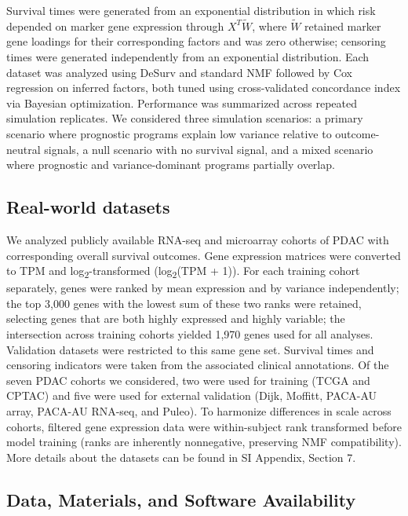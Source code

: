 \documentclass[9pt,twocolumn,twoside,]{pnas-new}
\begin{document}
Survival times were generated from an exponential distribution in which
risk depended on marker gene expression through \(X^T\widetilde{W}\),
where \(\widetilde{W}\) retained marker gene loadings for their
corresponding factors and was zero otherwise; censoring times were
generated independently from an exponential distribution. Each dataset
was analyzed using DeSurv and standard NMF followed by Cox regression on
inferred factors, both tuned using cross-validated concordance index via
Bayesian optimization. Performance was summarized across repeated
simulation replicates. We considered three simulation scenarios: a
primary scenario where prognostic programs explain low variance relative
to outcome-neutral signals, a null scenario with no survival signal, and
a mixed scenario where prognostic and variance-dominant programs
partially overlap.

\subsection{Real-world datasets}\label{real-world-datasets}

We analyzed publicly available RNA-seq and microarray cohorts of PDAC
with corresponding overall survival outcomes. Gene expression matrices
were converted to TPM and log\textsubscript{2}-transformed
(log\textsubscript{2}(TPM + 1)). For each training cohort separately,
genes were ranked by mean expression and by variance independently; the
top 3,000 genes with the lowest sum of these two ranks were retained,
selecting genes that are both highly expressed and highly variable; the
intersection across training cohorts yielded 1,970 genes used for all
analyses. Validation datasets were restricted to this same gene set.
Survival times and censoring indicators were taken from the associated
clinical annotations. Of the seven PDAC cohorts we considered, two were
used for training (TCGA and CPTAC) and five were used for external
validation (Dijk, Moffitt, PACA-AU array, PACA-AU RNA-seq, and Puleo).
To harmonize differences in scale across cohorts, filtered gene
expression data were within-subject rank transformed before model
training (ranks are inherently nonnegative, preserving NMF
compatibility). More details about the datasets can be found in SI
Appendix, Section 7.

\subsection{Data, Materials, and Software
Availability}\label{data-materials-and-software-availability}
\end{document}
